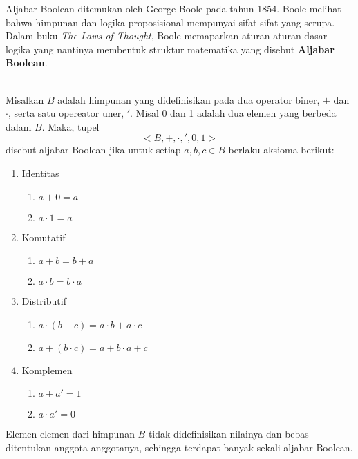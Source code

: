 \documentclass[11pt]{article}
\theoremstyle{definitionstyle}
\theoremstyle{theoremstyle}
\theoremstyle{examplestyle}
\begin{document}
\indent Aljabar Boolean ditemukan oleh George Boole pada tahun 1854. Boole melihat bahwa himpunan dan logika proposisional mempunyai sifat-sifat yang serupa. Dalam buku \textit{The Laws of Thought}, Boole memaparkan aturan-aturan dasar logika yang nantinya membentuk struktur matematika yang disebut \textbf{Aljabar Boolean}. 
\begin{definition} \hfill \\
    Misalkan $B$ adalah himpunan yang didefinisikan pada dua operator biner, $+$ dan $\cdot$, serta satu opereator uner, $'$. Misal 0 dan 1 adalah dua elemen yang berbeda dalam $B$. Maka, tupel
    $$<B, +, \cdot, ', 0, 1>$$
    disebut aljabar Boolean jika untuk setiap $a, b, c \in B$ berlaku aksioma berikut:
    \begin{enumerate}[left=0pt, itemsep=1.5pt, topsep=1.5pt]
        \item Identitas
        \begin{enumerate}[left=0pt, itemsep=1.5pt, topsep=1.5pt, label=\roman*)]
            \item $a + 0 = a$
            \item $a \cdot 1 = a$
        \end{enumerate}
        \item Komutatif
        \begin{enumerate}[left=0pt, itemsep=1.5pt, topsep=1.5pt, label=\roman*)]
            \item $a + b = b + a$
            \item $a \cdot b = b \cdot a$
        \end{enumerate}
        \item Distributif
        \begin{enumerate}[left=0pt, itemsep=1.5pt, topsep=1.5pt, label=\roman*)]
            \item $a \cdot (b + c) = a \cdot b + a \cdot c$
            \item $a + (b \cdot c) = a + b \cdot a + c$
        \end{enumerate}
        \item Komplemen
        \begin{enumerate}
            \item $a + a' = 1$
            \item $a \cdot a' = 0$
        \end{enumerate}
    \end{enumerate}
    Elemen-elemen dari himpunan $B$ tidak didefinisikan nilainya dan bebas ditentukan anggota-anggotanya, sehingga terdapat banyak sekali aljabar Boolean.
\end{definition}
\end{document}
